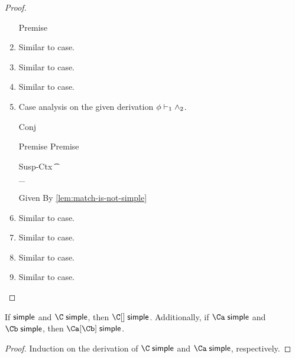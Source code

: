 \documentclass[acmsmall,screen,nonacm,review]{acmart}
\begin{document}
\begin{lemma}
\begin{proof}
\begin{enumerate}[(\roman*)]
\begin{proofcases}
	    \begin{llproof}
\Hand 		\eqPf{\semenv(\tone)}{\semenv(\ttwo)}  {Premise}
	    \end{llproof}
	\end{proofcases}

      \item Similar to  case.
      \item Similar to  case.
      \item Similar to  case.

      \item Case analysis on the given derivation $\phi \vdash \relax_1 \wedge \relax_2$.
      \begin{proofcases}
	\proofcasederivation
	  {Conj}
	  {\semenv \th \cone \\ \semenv \th \ctwo}
	  {\semenv \th \cone \cand \ctwo}

	\begin{llproof}
\Hand 	  \vdashPf{\semenv}{\cone} {Premise}
\Hand     \vdashPf{\semenv}{\ctwo} {Premise}
	\end{llproof}

	\proofcasederivation
	  {Susp-Ctx}
	  {\Cshape \C \t \sh \\ \semenv \th \C\where{\cmatched \t \sh \cbrs}}
	  {\semenv \th \underbrace{\C\where{\cmatch \t \cbrs}}_{\cone \cand \ctwo}}

	\begin{llproof}
	  \simplePf{\C\where{\cmatch \t \cbrs}} {Given}
	  \nsimplePf{\C\where{\cmatch \t \cbrs}} {By \cref{lem:match-is-not-simple}}
\Hand 	  \contraPf{\semenv \th \cone, \semenv \th \ctwo}
	\end{llproof}

      \end{proofcases}

      \item Similar to  case.
      \item Similar to  case.
      \item Similar to  case.
      \item Similar to  case.
    \end{enumerate}
  \end{proof}
\end{lemma}

\begin{lemma}
  \label{lem:compose-simple}
  If $\relax \mathrel{\mathsf{simple}}\mathclose{}$ and $\C \simple$, then $\C\where\c \simple$.
  Additionally, if $\Ca \simple$ and $\Cb \simple$, then $\Ca\where\Cb \simple$.
  \begin{proof}
    Induction on the derivation of $\C \simple$ and $\Ca \simple$, respectively.
  \end{proof}
\end{lemma}
\end{document}

